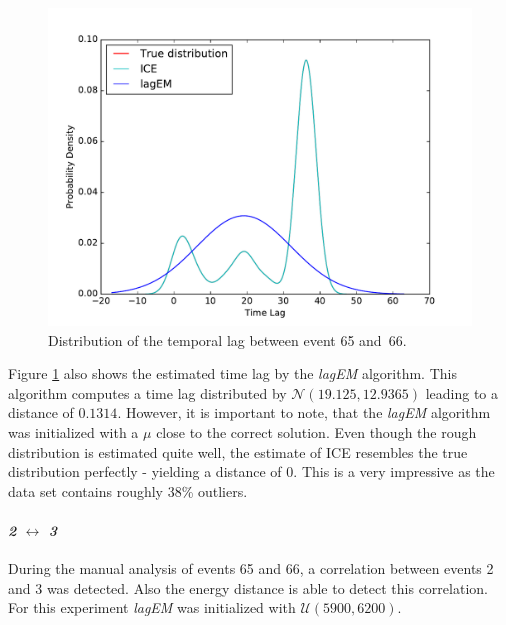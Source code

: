 \documentclass[conference]{IEEEtran}
\theoremstyle{examplestyle}
\begin{document}
\begin{figure}[!tb]
	\centering
	\includegraphics[scale=0.4]{images/symantec/66-65.pdf}
	\caption{Distribution of the temporal lag between event 65 and~66.}
	\label{fig:66-65}
\end{figure}

Figure \ref{fig:66-65} also shows the estimated time lag by the \textit{lagEM} algorithm. This algorithm computes a time lag distributed by \(\mathcal{N}(19.125, 12.9365)\) leading to a distance of $0.1314$. However, it is important to note, that the \textit{lagEM} algorithm was initialized with a \(\mu\) close to the correct solution. Even though the rough distribution is estimated quite well, the estimate of \ac{ICE} resembles the true distribution perfectly - yielding a distance of $0$. This is a very impressive  as the data set contains roughly 38\% outliers.



\paragraph{\textit{2} \(\leftrightarrow\) \textit{3}} During the manual analysis of events 65 and 66, a correlation between events 2 and 3 was detected. Also the energy distance is able to detect this correlation. For this experiment \textit{lagEM} was initialized with \(\mathcal{U}(5900, 6200)\).
\end{document}
